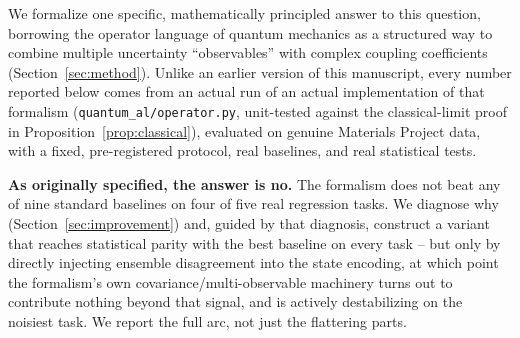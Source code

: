 \documentclass[conference]{IEEEtran}
\begin{document}
We formalize one specific, mathematically principled answer to this question, borrowing the operator language of quantum mechanics as a structured way to combine multiple uncertainty ``observables'' with complex coupling coefficients (Section~\ref{sec:method}). Unlike an earlier version of this manuscript, every number reported below comes from an actual run of an actual implementation of that formalism (\texttt{quantum\_al/operator.py}, unit-tested against the classical-limit proof in Proposition~\ref{prop:classical}), evaluated on genuine Materials Project data, with a fixed, pre-registered protocol, real baselines, and real statistical tests.

\textbf{As originally specified, the answer is no.} The formalism does not beat any of nine standard baselines on four of five real regression tasks. We diagnose why (Section~\ref{sec:improvement}) and, guided by that diagnosis, construct a variant that reaches statistical parity with the best baseline on every task -- but only by directly injecting ensemble disagreement into the state encoding, at which point the formalism's own covariance/multi-observable machinery turns out to contribute nothing beyond that signal, and is actively destabilizing on the noisiest task. We report the full arc, not just the flattering parts.
\end{document}
